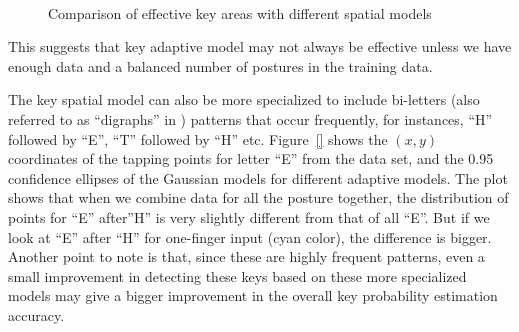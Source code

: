 \documentclass{sigchi}
\begin{document}
\begin{figure}[tb]
  \centering
   ~
  \caption{Comparison of effective key areas with different spatial models}
  \label{fig:key-boundary}
\end{figure}

This suggests that key adaptive model may not always be effective unless we
have enough data and a balanced number of postures in the training data. 

The key spatial model can also be more specialized to include bi-letters
(also referred to as ``digraphs'' in \cite{Zhai:2000}) patterns that occur
frequently, for instances, ``H'' followed by ``E'', ``T'' followed by ``H'' etc.
Figure~\ref{} shows the $(x, y)$ coordinates of the tapping points for letter
``E'' from the data set, and the 0.95 confidence ellipses of the Gaussian
models for different adaptive models. The plot shows that when we combine data
for all the posture together, the distribution of points for ``E'' after''H'' is
very slightly different from that of all ``E''. But if we look at ``E'' after
``H'' for one-finger input (cyan color), the difference is bigger. Another point 
to note is that, since these are highly frequent patterns, even a small 
improvement in detecting these keys based on these more specialized models may 
give a bigger improvement in the overall key probability estimation accuracy.
\end{document}
